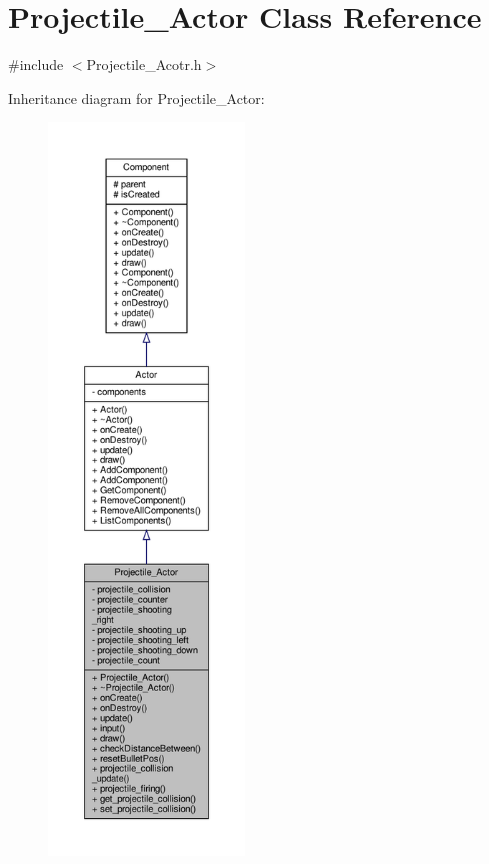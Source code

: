 \hypertarget{classProjectile__Actor}{}\section{Projectile\+\_\+\+Actor Class Reference}
\label{classProjectile__Actor}


{\ttfamily \#include $<$Projectile\+\_\+\+Acotr.\+h$>$}



Inheritance diagram for Projectile\+\_\+\+Actor\+:
\nopagebreak
\begin{figure}[H]
\begin{center}
\leavevmode
\includegraphics[height=550pt]{classProjectile__Actor__inherit__graph}
\end{center}
\end{figure}


